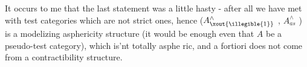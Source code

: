 It occurs to me that  the last statement  was a little hasty  -
after all we have met with test categories which are not strict ones,
hence ($A^{\wedge}_{\xout{\illegible{1}}}$ , $A^{\wedge}_{as}$ )  is a modelizing asphericity structure  (it would be
enough even that $A$ be a pseudo-test category),  which is'nt totally asphe
ric,  and a fortiori does not come from a contractibility structure. 

